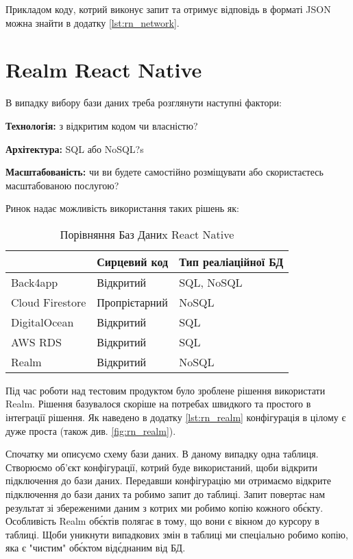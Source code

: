 Прикладом коду, котрий виконує запит та отримує відповідь в форматі JSON можна знайти в додатку \ref{lst:rn_network}.


\section{Realm React Native}
\label{sec:rn_realm}
В випадку вибору бази даних треба розглянути наступні фактори:
\begin{itemize}
    \begin{item}
        \textbf{Технологія:} з відкритим кодом чи власністю?
    \end{item}
    \begin{item}
        \textbf{Архітектура:} SQL або NoSQL?s
    \end{item}
    \begin{item}
        \textbf{Масштабованість:} чи ви будете самостійно розміщувати або скористаєтесь масштабованою послугою?
    \end{item}
\end{itemize}

Ринок надає можливість використання таких рішень як:

\begin{longtable}[c]{|l|l|l|}
    \caption{Порівняння Баз Даниx React Native}
    \label{tab:rn_db_comparison} \\
    \hline
    & Сирцевий код  & Тип реаліаційної БД \\ \hline
    \endhead
%
    Back4app        & Відкритий     & SQL, NoSQL          \\ \hline
    Cloud Firestore & Пропрієтарний & NoSQL               \\ \hline
    DigitalOcean    & Відкритий     & SQL                 \\ \hline
    AWS RDS         & Відкритий     & SQL                 \\ \hline
    Realm           & Відкритий     & NoSQL               \\ \hline
\end{longtable}

Під час роботи над тестовим продуктом було зроблене рішення використати Realm.
Рішення базувалося скоріше на потребах швидкого та простого в інтеграції рішення.
Як наведено в додатку \ref{lst:rn_realm}  конфігурація в цілому є дуже проста (також див. \ref{fig:rn_realm}).

Спочатку ми описуємо схему бази даних. В даному випадку одна таблиця.
Створюємо об'єкт конфігурації, котрий буде використаний, щоби відкрити підключення до бази даних.
Передавши конфігурацію ми отримаємо відкрите підключення до бази даних та робимо запит до таблиці.
Запит повертає нам результат зі збереженими даним з котрих ми робимо копію кожного об\'єкту.
Особливість Realm об\'єктів полягає в тому, що вони є вікном до курсору в таблиці.
Щоби уникнути випадкових змін в таблиці ми спеціально робимо копію, яка є "чистим" об\'єктом від\'єднаним від БД.

